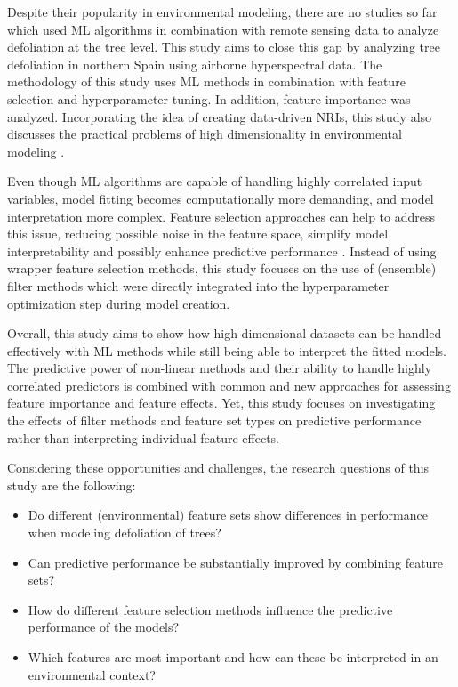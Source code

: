 \documentclass[remotesensing,article,submit,moreauthors,pdftex]{Definitions/mdpi}
\begin{document}
Despite their popularity in environmental modeling, there are no studies so far which used ML algorithms in combination with remote sensing data to analyze defoliation at the tree level.
This study aims to close this gap by analyzing tree defoliation in northern Spain using airborne hyperspectral data.
The methodology of this study uses ML methods in combination with feature selection and hyperparameter tuning.
In addition, feature importance was analyzed.
Incorporating the idea of creating data-driven \ac{NRI}s, this study also discusses the practical problems of high dimensionality in environmental modeling \cite{trunk1979, xu2016}.

Even though \ac{ML} algorithms are capable of handling highly correlated input variables, model fitting becomes computationally more demanding, and model interpretation more complex.
Feature selection approaches can help to address this issue, reducing possible noise in the feature space, simplify model interpretability and possibly enhance predictive performance \cite{cai2018}.
Instead of using wrapper feature selection methods, this study focuses on the use of (ensemble) filter methods which were directly integrated into the hyperparameter optimization step during model creation.

Overall, this study aims to show how high-dimensional datasets can be handled effectively with ML methods while still being able to interpret the fitted models.
The predictive power of non-linear methods and their ability to handle highly correlated predictors is combined with common and new approaches for assessing feature importance and feature effects.
Yet, this study focuses on investigating the effects of filter methods and feature set types on predictive performance rather than interpreting individual feature effects.

Considering these opportunities and challenges, the research questions of this study are the following:

\begin{itemize}

	\item Do different (environmental) feature sets show differences in performance when modeling defoliation of trees?

	\item Can predictive performance be substantially improved by combining feature sets?

	\item How do different feature selection methods influence the predictive performance of the models?

	\item Which features are most important and how can these be interpreted in an environmental context?

\end{itemize}
\end{document}
